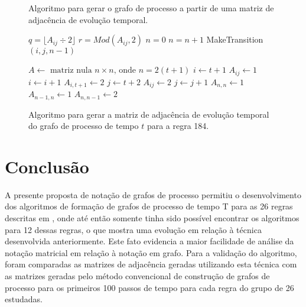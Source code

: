 \documentclass[a4,11pt]{article}
\begin{document}
\begin{figure*}[ttt!]

\begin{minipage}[t]{3.00in}
\begin{algorithm}[H]
\caption{Algoritmo para gerar o grafo de processo a partir de uma matriz de
adjacência de evolução temporal.}
\label{alg:mtos}
\begin{algorithmic}
            \REPEAT
                \STATE $q = \lfloor A_{ij} \div 2 \rfloor$
                \STATE $r = Mod(A_{ij},2)$
                    \STATE $n=0$
                        \STATE $n=n+1$
                    \ENDWHILE
                    \STATE MakeTransition$(i,j,n-1)$
                \ENDIF
        \ENDIF
    \ENDFOR
\ENDFOR
\end{algorithmic}
\end{algorithm}
\end{minipage}
\hfill
\begin{minipage}[t]{3.00in}
\begin{algorithm}[H]
\caption{Algoritmo para gerar a matriz de adjacência de evolução temporal do
grafo de processo de tempo $t$ para a regra 184.}
\label{alg:r184}
\begin{algorithmic}
\STATE $A \leftarrow \mbox{ matriz nula } n \times n \mbox{, onde } n=2(t+1)$
\STATE $i \leftarrow t+1$
    \STATE $A_{ij} \leftarrow 1$
    \STATE $i \leftarrow i+1$
\ENDFOR
{}
    \STATE $A_{i,t+1} \leftarrow 2$
\ENDFOR
\STATE $j \leftarrow t+2$
    \STATE $A_{ij} \leftarrow 2$
    \STATE $j \leftarrow j+1$
\ENDFOR
\STATE $A_{n,n} \leftarrow 1$
\STATE $A_{n-1,n} \leftarrow 1$
\STATE $A_{n,n-1} \leftarrow 2$
\end{algorithmic}
\end{algorithm}
\end{minipage}
\hfill
\end{figure*}

\section{Conclusão}\label{sec:conclusion}

A presente proposta de notação de grafos de processo permitiu o
desenvolvimento dos algoritmos de formação de grafos de processo de tempo
T para as 26 regras descritas em \cite{trafaniuc2004}, onde até então
somente tinha sido possível encontrar os algoritmos para 12 dessas regras,
o que mostra uma evolução em relação à técnica desenvolvida anteriormente.
Este fato evidencia a maior facilidade de análise da notação matricial em
relação à notação em grafo. Para a validação do algoritmo, foram comparadas
as matrizes de adjacência geradas utilizando esta técnica com as matrizes
geradas pelo método convencional de construção de grafos de processo para
os primeiros 100 passos de tempo para cada regra do grupo de 26 estudadas.
\end{document}
